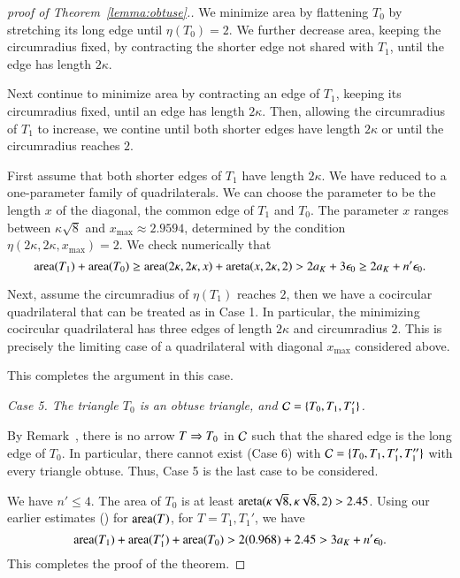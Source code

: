 \begin{proof}[proof of Theorem~\ref{lemma:obtuse}.]
We minimize area by flattening $T_0$ by stretching its long edge until
$\eta(T_0)=2$.  We further decrease area, keeping the circumradius
fixed, by contracting the shorter edge not shared with $T_1$, until
the edge has length $2\kappa$.

Next continue to minimize area by contracting an edge of $T_1$,
keeping its circumradius fixed, until an edge has length $2\kappa$.
Then, allowing the circumradius of $T_1$ to increase, we contine until
both shorter edges have length $2\kappa$ or until the circumradius
reaches $2$.

First assume that both shorter edges of $T_1$ have length $2\kappa$.
We have reduced to a one-parameter family of quadrilaterals.  We can
choose the parameter to be the length $x$ of the diagonal, the common
edge of $T_1$ and $T_0$.  The parameter $x$ ranges between
$\kappa\sqrt{8}$ and $x_{\max}\approx 2.9594$, determined by the
condition $\eta(2\kappa,2\kappa,x_{\max}) = 2$.  We check numerically
that
\[
{\operatorname{area}}(T_1) + {\operatorname{area}}(T_0) \ge {\operatorname{area}}(2\kappa,2\kappa,x) +
{\operatorname{areta}}(x,2\kappa,2) > 2a_K + 3 \epsilon_0 \ge 2a_K + n'\epsilon_0.
\] %

Next, assume the circumradius of $\eta(T_1)$ reaches $2$, then we
have a cocircular quadrilateral that can be treated as in Case 1.  In
particular, the minimizing cocircular quadrilateral has three edges of
length $2\kappa$ and circumradius $2$.  This is precisely the limiting
case of a quadrilateral with diagonal $x_{\max}$ considered above.

This completes the argument in this case.

{\it Case 5. The triangle $T_0$ is an obtuse triangle, and $\mathcal C=\{T_0,T_1,T_1'\}$.}  

By Remark~, there is no arrow $T \Rightarrow T_0$ in $\mathcal C$
such that the shared edge is the long edge of $T_0$.  In particular,
there cannot exist (Case 6) with $\mathcal C=\{T_0,T_1,T_1',T_1''\}$ with
every triangle obtuse.  Thus, Case 5 is the last case to be
considered.

We have $n'\le 4$.
The area of $T_0$ is at least
${\operatorname{areta}}(\kappa\sqrt{8},\kappa\sqrt{8},2) > 2.45$.  
Using our earlier estimates ()
for ${\operatorname{area}}(T)$, for $T=T_1,T_1'$, we
have
\[
{\operatorname{area}}(T_1) + {\operatorname{area}}(T_1') + {\operatorname{area}}(T_0) > 2 (0.968) + 2.45 > 3a_K + n'\epsilon_0.
\] %
This completes the proof of the theorem.
\end{proof}


